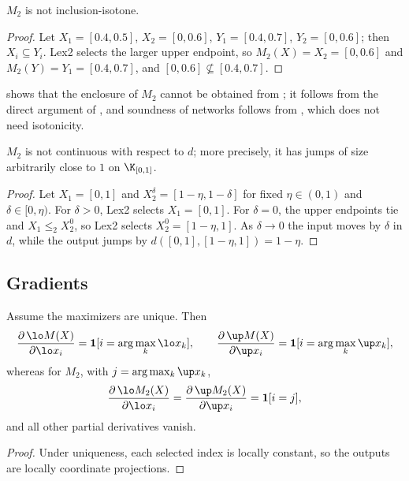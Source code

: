 \begin{theorem}\label{thm:not-isotone}
$M_2$ is not inclusion-isotone.
\end{theorem}

\begin{proof}
Let $X_1=[0.4,0.5]$, $X_2=[0,0.6]$, $Y_1=[0.4,0.7]$, $Y_2=[0,0.6]$; then $X_i\subseteq Y_i$. Lex2 selects the larger upper endpoint, so $M_2(X)=X_2=[0,0.6]$ and $M_2(Y)=Y_1=[0.4,0.7]$, and $[0,0.6]\not\subseteq[0.4,0.7]$.
\end{proof}

\begin{remark}
 shows that the enclosure of $M_2$ cannot be obtained from ; it follows from the direct argument of , and soundness of networks follows from , which does not need isotonicity.
\end{remark}

\begin{proposition}\label{prop:discont}
$M_2$ is not continuous with respect to $d$; more precisely, it has jumps of size arbitrarily close to $1$ on $\K_{[0,1]}$.
\end{proposition}

\begin{proof}
Let $X_1=[0,1]$ and $X_2^\delta=[1-\eta,1-\delta]$ for fixed $\eta\in(0,1)$ and $\delta\in[0,\eta)$. For $\delta>0$, Lex2 selects $X_1=[0,1]$. For $\delta=0$, the upper endpoints tie and $X_1\le_2X_2^0$, so Lex2 selects $X_2^0=[1-\eta,1]$. As $\delta\to0$ the input moves by $\delta$ in $d$, while the output jumps by $d([0,1],[1-\eta,1])=1-\eta$.
\end{proof}

\subsection{Gradients}

\begin{proposition}\label{prop:grad}
Assume the maximizers are unique. Then
\[
\frac{\partial\,\lo M(X)}{\partial\lo x_i}=\mathbf 1[i=\arg\max_k\lo x_k],\qquad
\frac{\partial\,\up M(X)}{\partial\up x_i}=\mathbf 1[i=\arg\max_k\up x_k],
\]
whereas for $M_2$, with $j=\arg\max_k\up x_k$,
\[
\frac{\partial\,\lo M_2(X)}{\partial\lo x_i}=\frac{\partial\,\up M_2(X)}{\partial\up x_i}=\mathbf 1[i=j],
\]
and all other partial derivatives vanish.
\end{proposition}

\begin{proof}
Under uniqueness, each selected index is locally constant, so the outputs are locally coordinate projections.
\end{proof}

